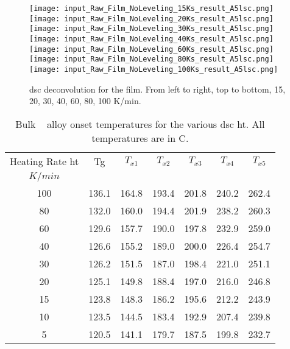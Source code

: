 \documentclass[a4paper,12pt,oneside]{article}%
\begin{document}
\begin{figure}[b]
	\centering
	\texttt{[image: input\_Raw\_Film\_NoLeveling\_15Ks\_result\_A5lsc.png]}\quad
	\texttt{[image: input\_Raw\_Film\_NoLeveling\_20Ks\_result\_A5lsc.png]}\quad
	\texttt{[image: input\_Raw\_Film\_NoLeveling\_30Ks\_result\_A5lsc.png]}
	\medskip
	\texttt{[image: input\_Raw\_Film\_NoLeveling\_40Ks\_result\_A5lsc.png]}\quad
	\texttt{[image: input\_Raw\_Film\_NoLeveling\_60Ks\_result\_A5lsc.png]}\quad
	\texttt{[image: input\_Raw\_Film\_NoLeveling\_80Ks\_result\_A5lsc.png]}
	\medskip
	\texttt{[image: input\_Raw\_Film\_NoLeveling\_100Ks\_result\_A5lsc.png]}
	\caption{\acrshort{dsc} deconvolution for the film. From left to right, top to bottom, 15, 20, 30, 40, 60, 80, 100 K/min.}
	\label{fig:DSC_Film_Decon}
\end{figure}

\begin{table}[h]
	\centering
	\begin{tabular}{ c c c c c c c }
		\toprule
		Heating Rate \acrshort{ht} & \acrshort{Tg} & $T_{x1}$ & $T_{x2}$ & $T_{x3}$ & $T_{x4}$ & $T_{x5}$ \\ 
		$K/min$ & & & & & & \\
		\midrule
		100 & 136.1 & 164.8 & 193.4 & 201.8 & 240.2 & 262.4 \\
		80  & 132.0 & 160.0 & 194.4 & 201.9 & 238.2 & 260.3 \\
		60  & 129.6 & 157.7 & 190.0 & 197.8 & 232.9 & 259.0 \\
		40  & 126.6 & 155.2 & 189.0 & 200.0 & 226.4 & 254.7 \\
		30  & 126.2 & 151.5 & 187.0 & 198.4 & 221.0 & 251.1 \\
		20  & 125.1 & 149.8 & 188.4 & 197.0 & 216.0 & 246.8 \\
		15  & 123.8 & 148.3 & 186.2 & 195.6 & 212.2 & 243.9 \\
		10  & 123.5 & 144.5 & 183.4 & 192.9 & 207.4 & 239.8 \\
		5   & 120.5 & 141.1 & 179.7 & 187.5 & 199.8 & 232.7 \\ 
		\bottomrule
	\end{tabular}
	\caption{Bulk \MgZnCa~ alloy onset temperatures for the various \acrshort{dsc}  \acrshort{ht}. All temperatures are in \degree C.}
	\label{tab:BulkOnsets}
\end{table}
\end{document}
